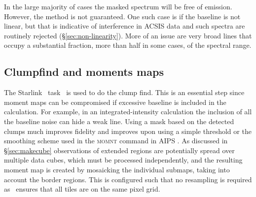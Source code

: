 \documentclass[final,authoryear,5p,times,twocolumn]{elsarticle}
\begin{document}
In the large majority of cases the masked spectrum will be free of
emission.  However, the method is not guaranteed.  One such case is if
the baseline is not linear, but that is indicative of interference in
ACSIS data and such spectra are routinely rejected
(\mbox{\S \ref{sec:non-linearity}}).  More of an issue are very broad
lines that occupy a substantial fraction, more than half in some
cases, of the spectral range.

\subsection{Clumpfind and moments maps \label{sec:moment}}

The Starlink \cupid\ task \findclumps\ is used to do the clump
find. This is an essential step since moment maps can be compromised
if excessive baseline is included in the calculation. For example, in an
integrated-intensity calculation the inclusion of all the baseline noise can
hide a weak line.
Using a mask based on the detected clumps much improves
fidelity and improves upon using a simple threshold or
the smoothing scheme used in the \textsc{momnt} command in AIPS
\cite[][]{2003ASSL..285..109G}. As discussed in
\mbox{\S \ref{sec:makecube}}
observations of extended regions are potentially spread over multiple
data cubes, which must be processed independently, and the resulting
moment map is created by
mosaicking the individual submaps, taking into account the border
regions. This is configured such that no resampling is required as
\makecube\ ensures that all tiles are on the same pixel grid.
\end{document}
